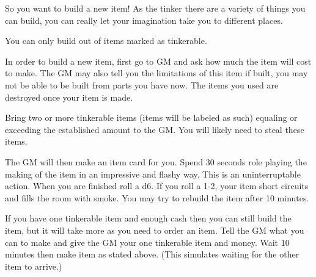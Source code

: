 \documentclass[green]{LRSguildcamp1}
\begin{document}
\name{\gTinkering{}}

So you want to build a new item! As the tinker there are a variety of things you can build, you can really let your imagination take you to different places. 

You can only build out of items marked as tinkerable.

In order to build a new item, first go to GM and ask how much the item will cost to make. The GM may also tell you the limitations of this item if built, you may not be able to be built from parts you have now. The items you used are destroyed once your item is made.

Bring two or more tinkerable items (items will be labeled as such) equaling or exceeding the established amount to the GM. You will likely need to steal these items. 

The GM will then make an item card for you. Spend 30 seconds role playing the making of the item in an impressive and flashy way. This is an uninterruptable action. When you are finished roll a d6.  If you roll a 1-2, your item short circuits and fills the room with smoke. You may try to rebuild the item after 10 minutes. 

If you have one tinkerable item and enough cash then you can still build the item, but it will take more as you need to order an item. Tell the GM what you can to make and give the GM your one tinkerable item and money. Wait 10 minutes then make item as stated above. (This simulates waiting for the other item to arrive.) 

\end{document}
